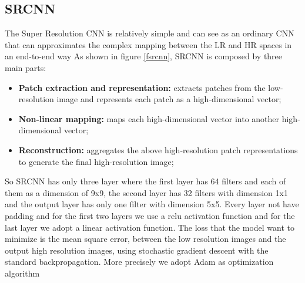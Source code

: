 \documentclass[10pt,twocolumn,letterpaper]{article}
\begin{document}
\subsection{SRCNN}
The Super Resolution CNN \cite{dong2014image} is relatively simple and can see as an ordinary CNN that can approximates the complex mapping between the LR and HR spaces in an end-to-end way
As shown in figure \ref{fsrcnn}, SRCNN is composed by three main parts:
\begin{itemize}
	\item \textbf{Patch extraction and representation:} extracts patches from the low-resolution image  and represents each patch as a high-dimensional vector;
	\item \textbf{Non-linear mapping:} maps each high-dimensional vector into another high-dimensional vector;
	 \item \textbf{Reconstruction:} aggregates the above high-resolution patch representations to generate the final high-resolution image;
\end{itemize}
So SRCNN has only three layer where the first layer has 64 filters and each of them as a dimension of 9x9, the second layer has 32 filters with dimension 1x1 and the output layer has only one filter with dimension 5x5. Every layer not have padding and for the first two layers we use a relu activation function and for the last layer we adopt a linear activation function. The loss that the model want to minimize is the mean square error, between the low resolution images and the output high resolution images, using stochastic gradient descent with the standard backpropagation. More precisely we adopt Adam as optimization algorithm 
\end{document}
